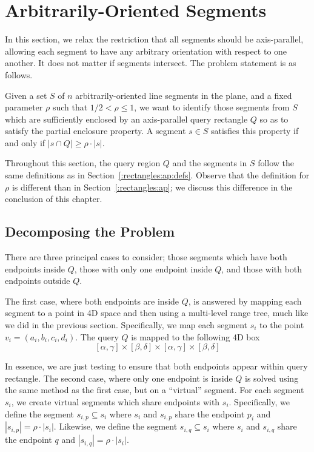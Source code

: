 \section{Arbitrarily-Oriented Segments}
\label{:rectangles:ao}

In this section, we relax the restriction that all segments should be axis-parallel, allowing each segment to have any arbitrary orientation with respect to one another. 
It does not matter if segments intersect. 
The problem statement is as follows.

\begin{problem}
Given a set $S$ of $n$ arbitrarily-oriented line segments in the plane, and a fixed parameter $\rho$ such that $1/2 < \rho \leq 1$, we want to identify those segments from $S$ which are sufficiently enclosed by an axis-parallel query rectangle $Q$ so as to satisfy the partial enclosure property. 
A segment $s \in S$ satisfies this property if and only if $|s \cap Q| \geq \rho \cdot |s|$.
\end{problem}

Throughout this section, the query region $Q$ and the segments in $S$ follow the same definitions as in Section~\ref{:rectangles:ap:defs}. 
Observe that the definition for $\rho$ is different than in Section~\ref{:rectangles:ap}; we discuss this difference in the conclusion of this chapter.


\subsection{Decomposing the Problem}
\label{:rectangles:ao:approach}

There are three principal cases to consider; those segments which have both endpoints inside $Q$, those with only one endpoint inside $Q$, and those with both endpoints outside $Q$.  

The first case, where both endpoints are inside $Q$, is answered by mapping each segment to a point in 4D space and then using a multi-level range tree, much like we did in the previous section.  Specifically, we map each segment $s_i$ to the point $v_i = (a_i, b_i, c_i, d_i)$. The query $Q$ is mapped to the following 4D box
\[
[\alpha, \gamma] \times [\beta, \delta] \times [\alpha, \gamma] \times [\beta, \delta]
\]

In essence, we are just testing to ensure that both endpoints appear within query rectangle.
The second case, where only one endpoint is inside $Q$ is solved using the same method as the first case, but on a ``virtual'' segment.
For each segment $s_i$, we create virtual segments which share endpoints with $s_i$.
Specifically, we define the segment $s_{i,p} \subseteq s_i$ where $s_i$ and $s_{i,p}$ share the endpoint $p_i$ and $|s_{i,p}| = \rho \cdot |s_i|$.
Likewise, we define the segment $s_{i,q} \subseteq s_i$ where $s_i$ and $s_{i,q}$ share the endpoint $q$ and $|s_{i,q}| = \rho \cdot |s_i|$.

